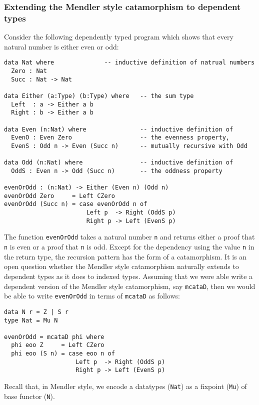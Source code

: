 \subsubsection{Extending the Mendler style catamorphism to dependent types}
\label{sec:plan:depty}
Consider the following dependently typed program
which shows that every natural number is either even or odd:
\begin{verbatim}
data Nat where              -- inductive definition of natrual numbers
  Zero : Nat
  Succ : Nat -> Nat

data Either (a:Type) (b:Type) where   -- the sum type
  Left  : a -> Either a b
  Right : b -> Either a b

data Even (n:Nat) where               -- inductive definition of
  EvenO : Even Zero                   -- the evenness property,
  EvenS : Odd n -> Even (Succ n)      -- mutually recursive with Odd

data Odd (n:Nat) where                -- inductive definition of
  OddS : Even n -> Odd (Succ n)       -- the oddness property

evenOrOdd : (n:Nat) -> Either (Even n) (Odd n)
evenOrOdd Zero     = Left CZero
evenOrOdd (Succ n) = case evenOrOdd n of
                       Left p  -> Right (OddS p)
                       Right p -> Left (EvenS p)
\end{verbatim}
The function \verb|evenOrOdd| takes a natural number \verb|n| and
returns either a proof that \verb|n| is even or a proof that \verb|n| is odd.
Except for the dependency using the value \verb|n| in the return type,
the recursion pattern has the form of a catamorphism.
It is an open question whether the Mendler style catamorphism naturally extends
to dependent types as it does to indexed types.
Assuming that we were able write a dependent version of the Mendler style
catamorphism, say \verb|mcataD|, then we would be able to write
\verb|evenOrOdd| in terms of \verb|mcataD| as follows:
\begin{verbatim}
data N r = Z | S r
type Nat = Mu N

evenOrOdd = mcataD phi where
  phi eoo Z     = Left CZero
  phi eoo (S n) = case eoo n of
                    Left p  -> Right (OddS p)
                    Right p -> Left (EvenS p)
\end{verbatim}
Recall that, in Mendler style, we encode a datatypes (\eg \verb|Nat|)
as a fixpoint (\eg \verb|Mu|) of base functor (\eg \verb|N|).

